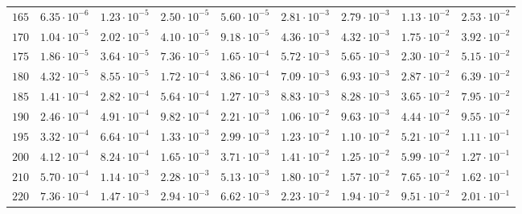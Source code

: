 \begin{landscape}
\begin{table}
\begin{tabular}{lcccccccc}
$	165	$ & $	6.35 \cdot 10^{-6} 	$ & $	1.23 \cdot 10^{-5} 	$ & $	2.50 \cdot 10^{-5} 	$ & $	5.60 \cdot 10^{-5} 	$ & $	2.81 \cdot 10^{-3} 	$ & $	2.79 \cdot 10^{-3} 	$ & $	1.13 \cdot 10^{-2} 	$ & $	2.53 \cdot 10^{-2} 	 $ \\
$	170	$ & $	1.04 \cdot 10^{-5} 	$ & $	2.02 \cdot 10^{-5} 	$ & $	4.10 \cdot 10^{-5} 	$ & $	9.18 \cdot 10^{-5} 	$ & $	4.36 \cdot 10^{-3} 	$ & $	4.32 \cdot 10^{-3} 	$ & $	1.75 \cdot 10^{-2} 	$ & $	3.92 \cdot 10^{-2} 	 $ \\
$	175	$ & $	1.86 \cdot 10^{-5} 	$ & $	3.64 \cdot 10^{-5} 	$ & $	7.36 \cdot 10^{-5} 	$ & $	1.65 \cdot 10^{-4} 	$ & $	5.72 \cdot 10^{-3} 	$ & $	5.65 \cdot 10^{-3} 	$ & $	2.30 \cdot 10^{-2} 	$ & $	5.15 \cdot 10^{-2} 	 $ \\
$	180	$ & $	4.32 \cdot 10^{-5} 	$ & $	8.55 \cdot 10^{-5} 	$ & $	1.72 \cdot 10^{-4} 	$ & $	3.86 \cdot 10^{-4} 	$ & $	7.09 \cdot 10^{-3} 	$ & $	6.93 \cdot 10^{-3} 	$ & $	2.87 \cdot 10^{-2} 	$ & $	6.39 \cdot 10^{-2} 	 $ \\
$	185	$ & $	1.41 \cdot 10^{-4} 	$ & $	2.82 \cdot 10^{-4} 	$ & $	5.64 \cdot 10^{-4} 	$ & $	1.27 \cdot 10^{-3} 	$ & $	8.83 \cdot 10^{-3} 	$ & $	8.28 \cdot 10^{-3} 	$ & $	3.65 \cdot 10^{-2} 	$ & $	7.95 \cdot 10^{-2} 	 $ \\
$	190	$ & $	2.46 \cdot 10^{-4} 	$ & $	4.91 \cdot 10^{-4} 	$ & $	9.82 \cdot 10^{-4} 	$ & $	2.21 \cdot 10^{-3} 	$ & $	1.06 \cdot 10^{-2} 	$ & $	9.63 \cdot 10^{-3} 	$ & $	4.44 \cdot 10^{-2} 	$ & $	9.55 \cdot 10^{-2} 	 $ \\
$	195	$ & $	3.32 \cdot 10^{-4} 	$ & $	6.64 \cdot 10^{-4} 	$ & $	1.33 \cdot 10^{-3} 	$ & $	2.99 \cdot 10^{-3} 	$ & $	1.23 \cdot 10^{-2} 	$ & $	1.10 \cdot 10^{-2} 	$ & $	5.21 \cdot 10^{-2} 	$ & $	1.11 \cdot 10^{-1} 	 $ \\
$	200	$ & $	4.12 \cdot 10^{-4} 	$ & $	8.24 \cdot 10^{-4} 	$ & $	1.65 \cdot 10^{-3} 	$ & $	3.71 \cdot 10^{-3} 	$ & $	1.41 \cdot 10^{-2} 	$ & $	1.25 \cdot 10^{-2} 	$ & $	5.99 \cdot 10^{-2} 	$ & $	1.27 \cdot 10^{-1} 	 $ \\
$	210	$ & $	5.70 \cdot 10^{-4} 	$ & $	1.14 \cdot 10^{-3} 	$ & $	2.28 \cdot 10^{-3} 	$ & $	5.13 \cdot 10^{-3} 	$ & $	1.80 \cdot 10^{-2} 	$ & $	1.57 \cdot 10^{-2} 	$ & $	7.65 \cdot 10^{-2} 	$ & $	1.62 \cdot 10^{-1} 	 $ \\
$	220	$ & $	7.36 \cdot 10^{-4} 	$ & $	1.47 \cdot 10^{-3} 	$ & $	2.94 \cdot 10^{-3} 	$ & $	6.62 \cdot 10^{-3} 	$ & $	2.23 \cdot 10^{-2} 	$ & $	1.94 \cdot 10^{-2} 	$ & $	9.51 \cdot 10^{-2} 	$ & $	2.01 \cdot 10^{-1} 	 $ \\

\end{tabular}
\end{table}
\end{landscape}
